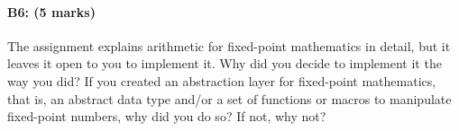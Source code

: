\paragraph{B6: (5 marks)}
The assignment explains arithmetic for fixed-point mathematics in detail, but it
leaves it open to you to implement it.  Why did you decide to implement it the
way you did?  If you created an abstraction layer for fixed-point mathematics,
that is, an abstract data type and/or a set of functions or macros to manipulate
fixed-point numbers, why did you do so?  If not, why not?
